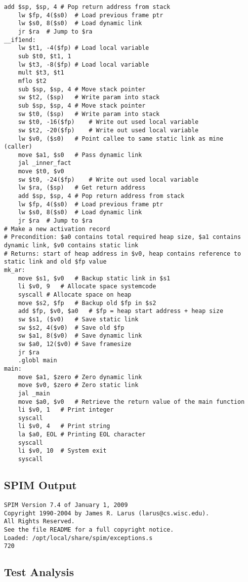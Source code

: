 \begin{lstlisting}[showstringspaces=false,breaklines=true,backgroundcolor=\color{light-gray}, captionpos=b]
	add $sp, $sp, 4	# Pop return address from stack
	lw $fp, 4($s0)	# Load previous frame ptr
	lw $s0, 8($s0)	# Load dynamic link
	jr $ra	# Jump to $ra
__if1end:
	lw $t1, -4($fp)	# Load local variable
	sub $t0, $t1, 1
	lw $t3, -8($fp)	# Load local variable
	mult $t3, $t1
	mflo $t2
	sub $sp, $sp, 4	# Move stack pointer
	sw $t2, ($sp)	# Write param into stack
	sub $sp, $sp, 4	# Move stack pointer
	sw $t0, ($sp)	# Write param into stack
	sw $t0, -16($fp)	# Write out used local variable
	sw $t2, -20($fp)	# Write out used local variable
	lw $v0, ($s0)	# Point callee to same static link as mine (caller)
	move $a1, $s0	# Pass dynamic link
	jal _inner_fact
	move $t0, $v0
	sw $t0, -24($fp)	# Write out used local variable
	lw $ra, ($sp)	# Get return address
	add $sp, $sp, 4	# Pop return address from stack
	lw $fp, 4($s0)	# Load previous frame ptr
	lw $s0, 8($s0)	# Load dynamic link
	jr $ra	# Jump to $ra
# Make a new activation record
# Precondition: $a0 contains total required heap size, $a1 contains dynamic link, $v0 contains static link
# Returns: start of heap address in $v0, heap contains reference to static link and old $fp value
mk_ar:
	move $s1, $v0	# Backup static link in $s1
	li $v0, 9	# Allocate space systemcode
	syscall	# Allocate space on heap
	move $s2, $fp	# Backup old $fp in $s2
	add $fp, $v0, $a0	# $fp = heap start address + heap size
	sw $s1, ($v0)	# Save static link
	sw $s2, 4($v0)	# Save old $fp
	sw $a1, 8($v0)	# Save dynamic link
	sw $a0, 12($v0)	# Save framesize
	jr $ra
	.globl main
main:
	move $a1, $zero	# Zero dynamic link
	move $v0, $zero	# Zero static link
	jal _main
	move $a0, $v0	# Retrieve the return value of the main function
	li $v0, 1	# Print integer
	syscall
	li $v0, 4	# Print string
	la $a0, EOL	# Printing EOL character
	syscall
	li $v0, 10	# System exit
	syscall

\end{lstlisting}\subsection{SPIM Output}
\begin{verbatim}
SPIM Version 7.4 of January 1, 2009
Copyright 1990-2004 by James R. Larus (larus@cs.wisc.edu).
All Rights Reserved.
See the file README for a full copyright notice.
Loaded: /opt/local/share/spim/exceptions.s
720
\end{verbatim}\subsection{Test Analysis}

